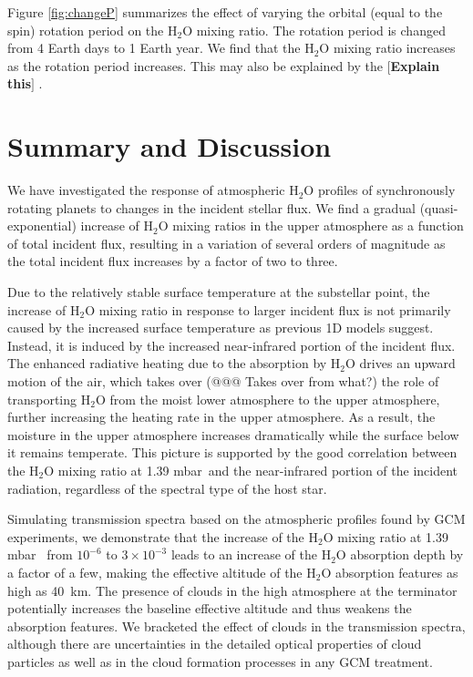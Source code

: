\documentclass[11pt,numberedappendix,twocolappendix,]{emulateapj}
\def\water{H$_2$O }
\def\preslevel{1.39 mbar\ }
\def\memo#1{\color{red}$[${\bf #1}$]$ \color{black}}
\newcommand{\dsa}[1]{{\color{blue}#1}}
\begin{document}
Figure \ref{fig:changeP} summarizes the \dsa{effect of varying the orbital (equal to the spin) rotation period on the \water mixing ratio}. 
The rotation period is changed from 4 Earth days to 1 Earth year. 
We find \dsa{that the \water mixing ratio} increases as the rotation period \dsa{increases}. 
This may also be explained by the 
\memo{Explain this}. 



\section{Summary and Discussion}
\label{s:summary}

We have investigated the response of \dsa{atmospheric} \water profiles of synchronously rotating planets to \dsa{changes} in the incident stellar flux. 
We find a gradual (quasi-exponential) increase of \water mixing \dsa{ratios} in the upper atmosphere as a function of total incident flux, resulting \dsa{in a variation of several} orders of magnitude \dsa{as the total incident flux increases by a factor of two to three}. 

Due to the \dsa{relatively stable} surface temperature at the \dsa{substellar} point, the increase of \water mixing ratio in response to larger incident flux is not primarily caused by the increased surface temperature as previous 1D models suggest. 
Instead, it is induced by the increased near-infrared portion of the incident flux. 
The enhanced radiative heating due to the absorption by \water drives \dsa{an} upward motion of the air, which takes over \dsa{(@@@ Takes over from what?)} the role of transporting \water from the moist lower atmosphere to the upper atmosphere, further increasing the heating rate in the upper atmosphere.
As a result, the moisture in the upper atmosphere increases dramatically while the \dsa{surface below} it remains temperate. 
This picture is supported by the good correlation between the \water mixing ratio at \preslevel and the near-infrared portion of the incident radiation, regardless of the spectral type of the host star. 

Simulating transmission spectra based on the atmospheric profiles found by GCM experiments, 
we demonstrate that the increase \dsa{of the \water mixing ratio at \preslevel} from $10^{-6}$ to $3 \times 10^{-3}$ \dsa{leads to an} increase of the \water absorption depth by a factor of a few, making the effective altitude of \dsa{the \water absorption features} as high as 40~km. 
The presence of clouds in the high atmosphere \dsa{at} the terminator potentially increases the baseline effective altitude and thus weakens the absorption features. 
We bracketed the effect of clouds in the transmission spectra, 
although there are uncertainties in the detailed optical properties of cloud particles as well as in the cloud formation processes in any GCM treatment. 
\end{document}
